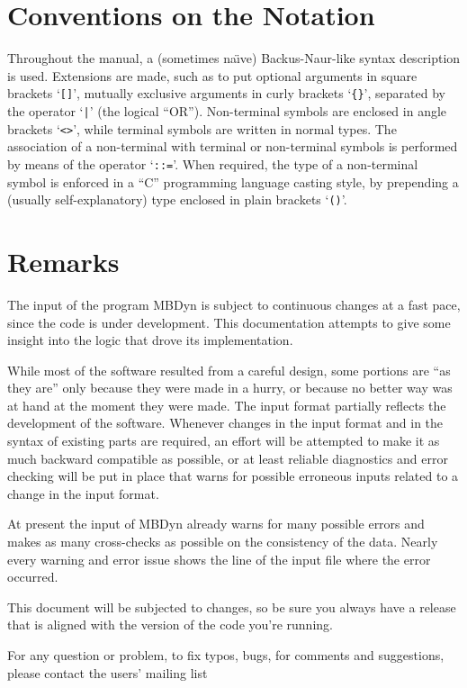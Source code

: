 \documentclass[10pt]{report}
\begin{document}
\section*{Conventions on the Notation}
Throughout the manual, a (sometimes na\"{\i}ve) 
Backus-Naur-like syntax description is used. 
Extensions are made, such as to put optional arguments in square brackets
`\texttt{[]}', mutually exclusive arguments in curly brackets `\texttt{\{\}}',
separated by the operator `\texttt{|}' (the logical ``OR'').
Non-terminal symbols are enclosed in angle brackets `\texttt{<>}', while
terminal symbols are written in normal types.
The association of a non-terminal with terminal or non-terminal
symbols is performed by means of the operator `\texttt{::=}'. 
When required, the type of a non-terminal symbol is enforced in a ``C''
programming language casting style, by prepending a (usually
self-explanatory) type enclosed in plain brackets `\texttt{()}'.


\section*{Remarks}
The input of the program MBDyn is subject to continuous changes
at a fast pace, since the code is under development.
This documentation attempts to give some insight into the logic 
that drove its implementation.

While most of the software resulted from a careful design, 
some portions are ``as they are'' only because they were made in a hurry, 
or because no better way was at hand at the moment they were made.
The input format partially reflects the development of the software.
Whenever changes in the input format and in the syntax 
of existing parts are required, an effort will be attempted to make 
it as much backward compatible as possible, or at least reliable 
diagnostics and error checking will be put in place that warns 
for possible erroneous inputs related to a change in the input format. 

At present the input of MBDyn already warns for many possible errors 
and makes as many cross-checks as possible on the consistency of the data. 
Nearly every warning and error issue shows the line of the input file 
where the error occurred. 

This document will be subjected to changes, so be sure you always have 
a release that is aligned with the version of the code you're running.

For any question or problem, to fix typos, bugs, for comments and
suggestions, please contact the users' mailing list
\end{document}
